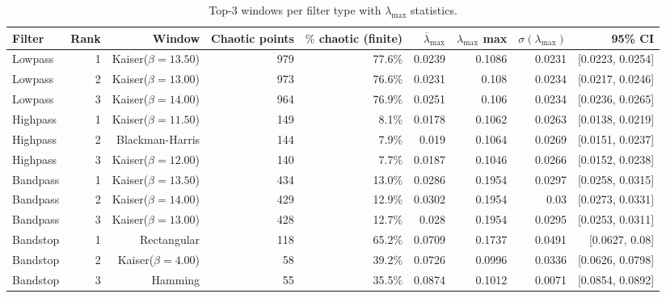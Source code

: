 \begin{table}[htbp]
  \centering
  \caption{Top-3 windows per filter type with $\lambda_{\max}$ statistics.}
  \begin{tabular}{lrrrrrrrr}
    \toprule
    Filter & Rank & Window & Chaotic points & $\%$ chaotic (finite) & $\overline{\lambda}_{\max}$ & $\lambda_{\max}$ max & $\sigma(\lambda_{\max})$ & 95\% CI \\
    \midrule
    Lowpass & 1 & Kaiser($\beta=13.50$) & 979 & 77.6\% & 0.0239 & 0.1086 & 0.0231 & [0.0223, 0.0254] \\
    Lowpass & 2 & Kaiser($\beta=13.00$) & 973 & 76.6\% & 0.0231 & 0.108 & 0.0234 & [0.0217, 0.0246] \\
    Lowpass & 3 & Kaiser($\beta=14.00$) & 964 & 76.9\% & 0.0251 & 0.106 & 0.0234 & [0.0236, 0.0265] \\
    Highpass & 1 & Kaiser($\beta=11.50$) & 149 & 8.1\% & 0.0178 & 0.1062 & 0.0263 & [0.0138, 0.0219] \\
    Highpass & 2 & Blackman-Harris & 144 & 7.9\% & 0.019 & 0.1064 & 0.0269 & [0.0151, 0.0237] \\
    Highpass & 3 & Kaiser($\beta=12.00$) & 140 & 7.7\% & 0.0187 & 0.1046 & 0.0266 & [0.0152, 0.0238] \\
    Bandpass & 1 & Kaiser($\beta=13.50$) & 434 & 13.0\% & 0.0286 & 0.1954 & 0.0297 & [0.0258, 0.0315] \\
    Bandpass & 2 & Kaiser($\beta=14.00$) & 429 & 12.9\% & 0.0302 & 0.1954 & 0.03 & [0.0273, 0.0331] \\
    Bandpass & 3 & Kaiser($\beta=13.00$) & 428 & 12.7\% & 0.028 & 0.1954 & 0.0295 & [0.0253, 0.0311] \\
    Bandstop & 1 & Rectangular & 118 & 65.2\% & 0.0709 & 0.1737 & 0.0491 & [0.0627, 0.08] \\
    Bandstop & 2 & Kaiser($\beta=4.00$) & 58 & 39.2\% & 0.0726 & 0.0996 & 0.0336 & [0.0626, 0.0798] \\
    Bandstop & 3 & Hamming & 55 & 35.5\% & 0.0874 & 0.1012 & 0.0071 & [0.0854, 0.0892] \\
    \bottomrule
  \end{tabular}
\end{table}
